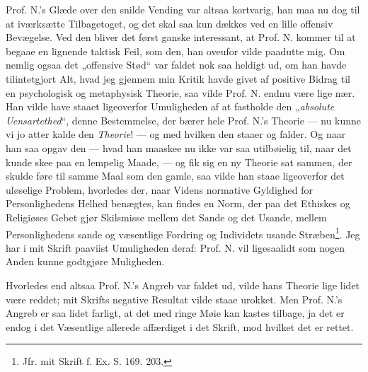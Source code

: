\documentclass[12pt,a4paper]{book}
\begin{document}
Prof. N.'s Glæde over den snilde Vending var altsaa kortvarig, han maa nu dog
til at iværksætte Tilbagetoget, og det skal saa kun dækkes ved en lille offensiv
Bevægelse. Ved den bliver det først ganske interessant, at Prof. N. kommer til
at begaae en lignende taktisk Feil, som den, han oveufor vilde paadutte mig. Om
nemlig ogsaa det „offensive Stød“ var faldet nok saa heldigt ud, om han havde
tilintetgjort Alt, hvad jeg gjennem min Kritik havde givet af positive Bidrag
til en psychologisk og metaphysisk Theorie, saa vilde Prof. N. endnu være lige
nær. Han vilde have staaet ligeoverfor Umuligheden af at fastholde den
„\emph{absolute Uensartethed}“, denne Bestemmelse, der bærer hele Prof. N.'s
Theorie --- nu kunne vi jo atter kalde den \emph{Theorie}! --- og med hvilken
den staaer og falder. Og naar han saa opgav den --- hvad han maaskee nu ikke var
saa utilbøielig til, naar det kunde skee paa en lempelig Maade, --- og fik sig
en ny Theorie sat sammen, der skulde føre til samme Maal som den gamle, saa
vilde han staae ligeoverfor det uløselige Problem, hvorledes der, naar Videns
normative Gyldighed for Personlighedens Helhed benægtes, kan findes en Norm, der
paa det Ethiskes og Religiøses Gebet gjør Skilsmisse mellem det Sande og det
Usande, mellem Personlighedens sande og væsentlige Fordring og Individets usande
Stræben\footnote{%
  Jfr. mit Skrift f. Ex. S. 169. 203.}. Jeg har i mit Skrift paaviist
Umuligheden deraf: Prof. N. vil ligesaalidt som nogen Anden kunne godtgjøre
Muligheden.

Hvorledes end altsaa Prof. N.'s Angreb var faldet ud, vilde hans Theorie lige
lidet være reddet; mit Skrifts negative Resultat vilde staae urokket. Men Prof.
N.'s Angreb er saa lidet farligt, at det med ringe Møie kan kastes tilbage, ja
det er endog i det Væsentlige allerede affærdiget i det Skrift, mod hvilket det
er rettet.
\end{document}
